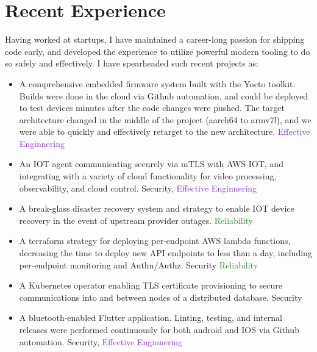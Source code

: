 \documentclass[letterpaper,11pt]{article}
\begin{document}
\section{Recent Experience}
Having worked at startups, I have maintained a
career-long passion for shipping code early, and developed the experience to
utilize powerful modern tooling to do so safely and effectively. I have
spearheaded such recent projects as:
\begin{itemize}
	\item A comprehensive embedded firmware system built with the Yocto toolkit. Builds were done in the cloud via Github automation, and could be deployed to test devices minutes after the code changes were pushed. The target architecture
	      changed in the middle of the project (aarch64 to armv7l), and we were able to quickly and effectively retarget to the new architecture. \textcolor{BlueViolet}{Effective Enginnering}
	\item An IOT agent communicating securely via mTLS with AWS IOT, and integrating with a variety of cloud functionality for video processing, observability, and cloud control. \textcolor{BrickRed}{Security}, \textcolor{BlueViolet}{Effective Enginnering}
	\item A break-glass disaster recovery system and strategy to enable IOT device recovery in the event of upstream provider outages. \textcolor{ForestGreen}{Reliability}
	\item A terraform strategy for deploying per-endpoint AWS lambda functions, decreasing the time to deploy new API endpoints to less than a day, including per-endpoint monitoring and Authn/Authz. \textcolor{BrickRed}{Security} \textcolor{ForestGreen}{Reliability}
	\item A Kubernetes operator enabling TLS certificate provisioning to secure communications into and between nodes of a distributed database. \textcolor{BrickRed}{Security}
	\item A bluetooth-enabled Flutter application. Linting, testing, and internal releases were performed continuously for both android and IOS via Github automation. \textcolor{BrickRed}{Security}, \textcolor{BlueViolet}{Effective Enginnering}
\end{itemize}
\
\end{document}
